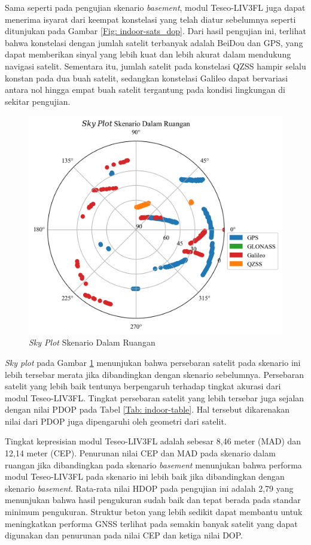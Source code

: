 Sama seperti pada pengujian skenario \textit{basement}, modul Teseo\hyp{}LIV3FL juga dapat menerima isyarat dari keempat konstelasi yang telah diatur sebelumnya seperti ditunjukan pada Gambar \ref{Fig: indoor-sats_dop}. Dari hasil pengujian ini, terlihat bahwa konstelasi dengan jumlah satelit terbanyak adalah BeiDou dan GPS, yang dapat memberikan sinyal yang lebih kuat dan lebih akurat dalam mendukung navigasi satelit. Sementara itu, jumlah satelit pada konstelasi QZSS hampir selalu konstan pada dua buah satelit, sedangkan konstelasi Galileo dapat bervariasi antara nol hingga empat buah satelit tergantung pada kondisi lingkungan di sekitar pengujian. 

\begin{figure}[H]
	\centering
	\captionsetup{justification=centering}
	\includegraphics[width=12cm]{contents/chapter-4/2-skenario-indoor/sky_plot.png}
	\caption{\textit{Sky Plot} Skenario Dalam Ruangan}
	\label{Fig: indoor-sky_plot}
\end{figure}

\textit{Sky plot} pada Gambar \ref{Fig: indoor-sky_plot} menunjukan bahwa persebaran satelit pada skenario ini lebih tersebar merata jika dibandingkan dengan skenario sebelumnya. Persebaran satelit yang lebih baik tentunya berpengaruh terhadap tingkat akurasi dari modul Teseo\hyp{}LIV3FL. Tingkat persebaran satelit yang lebih tersebar juga sejalan dengan nilai PDOP pada Tabel \ref{Tab: indoor-table}. Hal tersebut dikarenakan nilai dari PDOP juga dipengaruhi oleh geometri dari satelit.

Tingkat kepresisian modul Teseo\hyp{}LIV3FL adalah sebesar 8,46 meter (MAD) dan 12,14 meter (CEP). Penurunan nilai CEP dan MAD pada skenario dalam ruangan jika dibandingkan pada skenario \textit{basement} menunjukan bahwa performa modul Teseo\hyp{}LIV3FL pada skenario ini lebih baik jika dibandingkan dengan skenario \textit{basement}. Rata-rata nilai HDOP pada pengujian ini adalah 2,79 yang menunjukan bahwa hasil pengukuran sudah baik dan tepat berada pada standar minimum pengukuran. Struktur beton yang lebih sedikit dapat membantu untuk meningkatkan performa GNSS terlihat pada semakin banyak satelit yang dapat digunakan dan penurunan pada nilai CEP dan ketiga nilai DOP.

